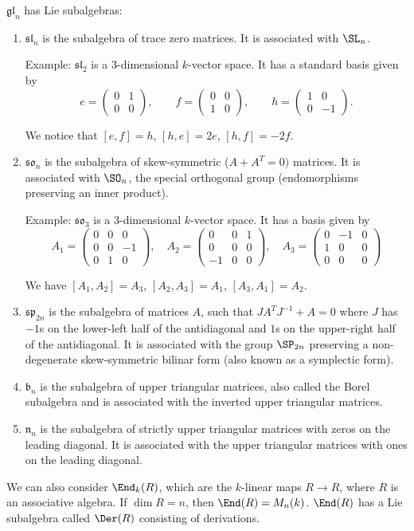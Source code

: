 $\mathfrak{gl}_n$ has Lie subalgebras:
\begin{enumerate}[label=(\arabic*)]
	\item $\mathfrak{sl}_n$ is the subalgebra of trace zero matrices. It is
		associated with $\SL_n$.

		Example: $\mathfrak{sl}_2$ is a $3$-dimensional $k$-vector space. It
		has a standard basis given by
		\[ e = \begin{pmatrix}0 & 1\\0 & 0\end{pmatrix},\qquad
			f = \begin{pmatrix}0 & 0\\1&0\end{pmatrix},\qquad
			h = \begin{pmatrix}1&0\\0&-1\end{pmatrix}. \]

		We notice that  $[e, f] = h$, $[h, e] = 2e$, $[h, f] = -2f$.

	\item $\mathfrak{so}_n$ is the subalgebra of skew-symmetric ($A + A^T = 0)$
		matrices. It is associated with $\SO_n$, the special orthogonal group
		(endomorphisms preserving an inner product).

		Example: $\mathfrak{so}_3$ is a $3$-dimensional $k$-vector space. It
		has a basis given by
		\[ A_1 = \begin{pmatrix}0&0&0\\0&0&-1\\0&1&0\end{pmatrix},\quad
			A_2 = \begin{pmatrix}0&0&1\\0&0&0\\-1&0&0\end{pmatrix},\quad
				A_3 = \begin{pmatrix}0&-1&0\\1&0&0\\0&0&0\end{pmatrix}\]

		We have $[A_1, A_2] = A_3$,  $[A_2, A_3] = A_1$, $[A_3, A_1] = A_2$.

	\item $\mathfrak{sp}_{2n}$ is the subalgebra of matrices $A$, such that
		$JA^TJ^{-1} + A = 0$ where $J$ has $-1$s on the lower-left half of the
		antidiagonal and $1$s on the upper-right half of the antidiagonal. It
		is associated with the group $\SP_{2n}$ preserving a non-degenerate
		skew-symmetric bilinar form (also known as a symplectic form).

	\item $\mathfrak{b}_n$ is the subalgebra of upper triangular matrices, also
		called the Borel subalgebra and is associated with the inverted upper
		triangular matrices.

	\item $\mathfrak{n}_n$ is the subalgebra of strictly upper triangular matrices
		with zeros on the leading diagonal. It is associated with the upper triangular
		matrices with ones on the leading diagonal.
\end{enumerate}

We can also consider $\End_k(R)$, which are the $k$-linear maps $R\to R$, where
$R$ is an associative algebra. If $\dim R = n$, then $\End(R) = M_n(k)$.
 $\End(R)$ has a Lie subalgebra called $\Der(R)$ consisting of derivations.
